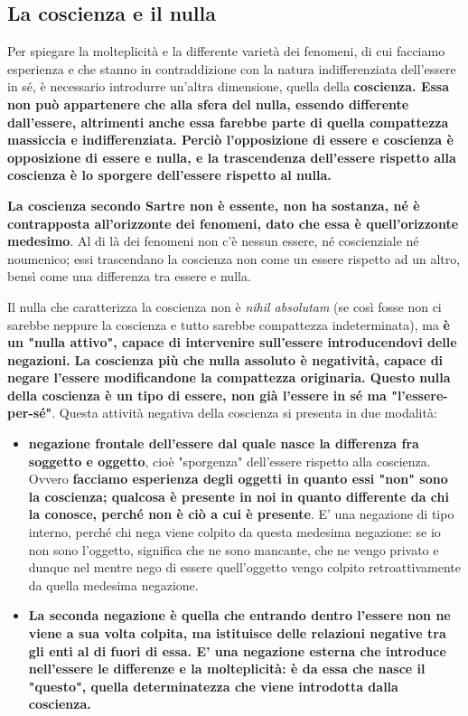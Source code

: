 \subsection{La coscienza e il nulla}

Per spiegare la molteplicità e la differente varietà
dei fenomeni, di cui facciamo esperienza e
che stanno in contraddizione con la natura
indifferenziata dell'essere in sé, è necessario
introdurre un'altra dimensione, quella della
\textbf{coscienza.
Essa non può appartenere che alla
sfera del nulla, essendo differente dall'essere,
altrimenti anche essa farebbe parte di quella
compattezza massiccia e indifferenziata.
Perciò l'opposizione di essere e coscienza è opposizione
di essere e nulla, e la trascendenza dell'essere rispetto
alla coscienza è lo sporgere dell'essere rispetto
al nulla.}

\textbf{La coscienza secondo Sartre non è essente, non ha
sostanza, né è contrapposta all'orizzonte dei fenomeni,
dato che essa è quell'orizzonte medesimo}. Al di
là dei fenomeni non c'è nessun essere, né
coscienziale né noumenico; essi trascendano la
coscienza non come un essere rispetto ad un altro,
bensì come una differenza tra essere e nulla.

Il nulla che caratterizza la coscienza non è
\textit{nihil absolutam} (se così fosse non ci sarebbe
neppure la coscienza e tutto sarebbe compattezza
indeterminata), ma \textbf{è un "nulla attivo", capace di
intervenire sull'essere introducendovi delle
negazioni.}
\textbf{La coscienza più che nulla assoluto è negatività,
capace di negare l'essere modificandone la
compattezza originaria. Questo nulla della
coscienza è un tipo di essere, non già l'essere
in sé ma "l'essere-per-sé"}. Questa attività
negativa della coscienza si presenta in due
modalità:

\begin{itemize}
	\item \textbf{negazione frontale dell'essere dal quale
	nasce la differenza fra soggetto e oggetto},
	cioè "sporgenza" dell'essere rispetto alla
	coscienza. Ovvero \textbf{facciamo esperienza degli
	oggetti in quanto essi "non" sono la coscienza;
	qualcosa è presente in noi in quanto differente
	da chi la conosce, perché non è ciò a cui
	è presente}. E' una negazione di tipo interno,
	perché chi nega viene colpito da questa medesima
	negazione: se io non sono l'oggetto, significa
	che ne sono mancante, che ne vengo privato
	e dunque nel mentre nego di essere quell'oggetto
	vengo colpito retroattivamente da quella
	medesima negazione.
	\item \textbf{La seconda negazione è quella che entrando
	dentro l'essere non ne viene a sua
	volta colpita, ma istituisce delle relazioni
	negative tra gli enti al di fuori di essa.
	E' una negazione esterna che introduce nell'essere le differenze e la molteplicità: è da
	essa che nasce il "questo", quella
	determinatezza che viene introdotta
	dalla coscienza.}
\end{itemize}


